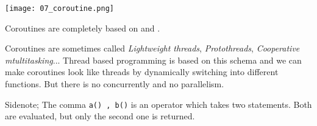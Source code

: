 \texttt{[image: 07\_coroutine.png]}

Coroutines are completely based on  and .

Coroutines are sometimes called \textit{Lightweight threads}, \textit{Protothreads}, \textit{Cooperative mtultitasking}... Thread based programming is based on this schema and we can make coroutines look like threads by dynamically switching into different functions. But there is no concurrently and no parallelism.

Sidenote; The comma \verb+a() , b()+ is an operator which takes two statements. Both are evaluated, but only the second one is returned.
